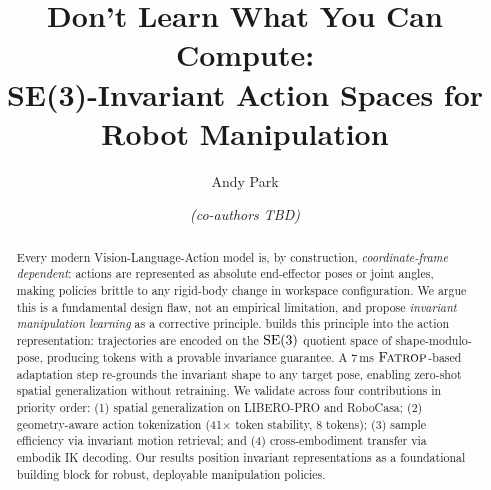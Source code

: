 \documentclass{article}
\title{Don't Learn What You Can Compute:\\
       SE(3)-Invariant Action Spaces for Robot Manipulation}
\author{Andy Park \and \textit{(co-authors TBD)}}
\begin{document}
\maketitle

\begin{abstract}
Every modern Vision-Language-Action model is, by construction,
\emph{coordinate-frame dependent}: actions are represented as absolute
end-effector poses or joint angles, making policies brittle to any
rigid-body change in workspace configuration.
We argue this is a fundamental design flaw, not an empirical limitation,
and propose \emph{invariant manipulation learning} as a corrective principle.
\dhb{} builds this principle into the action representation: trajectories are
encoded on the $\mathrm{SE}(3)$ quotient space of shape-modulo-pose, producing tokens
with a provable invariance guarantee.
A 7\,ms $\textsc{Fatrop}{}$-based adaptation step re-grounds the invariant shape to
any target pose, enabling zero-shot spatial generalization without retraining.
We validate across four contributions in priority order:
(1) spatial generalization on LIBERO-PRO and RoboCasa;
(2) geometry-aware action tokenization (41$\times$ token stability, 8 tokens);
(3) sample efficiency via invariant motion retrieval; and
(4) cross-embodiment transfer via embodik IK decoding.
Our results position invariant representations as a foundational building
block for robust, deployable manipulation policies.
\end{abstract}








\end{document}
